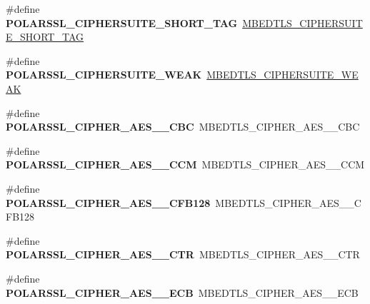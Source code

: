 \begin{DoxyCompactItemize}
\item 
\mbox{\label{compat-1_83_8h_ad6a95e1669ec593781489189077ff727}} 
\#define {\bfseries P\+O\+L\+A\+R\+S\+S\+L\+\_\+\+C\+I\+P\+H\+E\+R\+S\+U\+I\+T\+E\+\_\+\+S\+H\+O\+R\+T\+\_\+\+T\+AG}~\mbox{\hyperlink{ssl__ciphersuites_8h_aa4802f19cdfd24bb9cdbf643460b0355}{M\+B\+E\+D\+T\+L\+S\+\_\+\+C\+I\+P\+H\+E\+R\+S\+U\+I\+T\+E\+\_\+\+S\+H\+O\+R\+T\+\_\+\+T\+AG}}
\item 
\mbox{\label{compat-1_83_8h_a0cfe408058ec3f630c6b8b16c14d14db}} 
\#define {\bfseries P\+O\+L\+A\+R\+S\+S\+L\+\_\+\+C\+I\+P\+H\+E\+R\+S\+U\+I\+T\+E\+\_\+\+W\+E\+AK}~\mbox{\hyperlink{ssl__ciphersuites_8h_a16358b8eb0384954a6932a13fbebb13e}{M\+B\+E\+D\+T\+L\+S\+\_\+\+C\+I\+P\+H\+E\+R\+S\+U\+I\+T\+E\+\_\+\+W\+E\+AK}}
\item 
\mbox{\label{compat-1_83_8h_a5eca891b6c2e88f19ae6e4f674c34039}} 
\#define {\bfseries P\+O\+L\+A\+R\+S\+S\+L\+\_\+\+C\+I\+P\+H\+E\+R\+\_\+\+A\+E\+S\+\_\+\_\+\+C\+BC}~M\+B\+E\+D\+T\+L\+S\+\_\+\+C\+I\+P\+H\+E\+R\+\_\+\+A\+E\+S\+\_\+\_\+\+C\+BC
\item 
\mbox{\label{compat-1_83_8h_aec158b4d302d0542676406ee671c9476}} 
\#define {\bfseries P\+O\+L\+A\+R\+S\+S\+L\+\_\+\+C\+I\+P\+H\+E\+R\+\_\+\+A\+E\+S\+\_\+\_\+\+C\+CM}~M\+B\+E\+D\+T\+L\+S\+\_\+\+C\+I\+P\+H\+E\+R\+\_\+\+A\+E\+S\+\_\+\_\+\+C\+CM
\item 
\mbox{\label{compat-1_83_8h_ac1717311892a945a0103fe705d33b5af}} 
\#define {\bfseries P\+O\+L\+A\+R\+S\+S\+L\+\_\+\+C\+I\+P\+H\+E\+R\+\_\+\+A\+E\+S\+\_\+\_\+\+C\+F\+B128}~M\+B\+E\+D\+T\+L\+S\+\_\+\+C\+I\+P\+H\+E\+R\+\_\+\+A\+E\+S\+\_\+\_\+\+C\+F\+B128
\item 
\mbox{\label{compat-1_83_8h_a02fc8b0fa400bbd5086886d64f4801bc}} 
\#define {\bfseries P\+O\+L\+A\+R\+S\+S\+L\+\_\+\+C\+I\+P\+H\+E\+R\+\_\+\+A\+E\+S\+\_\+\_\+\+C\+TR}~M\+B\+E\+D\+T\+L\+S\+\_\+\+C\+I\+P\+H\+E\+R\+\_\+\+A\+E\+S\+\_\+\_\+\+C\+TR
\item 
\mbox{\label{compat-1_83_8h_a94079188ceb153d0ac54217c110e9c79}} 
\#define {\bfseries P\+O\+L\+A\+R\+S\+S\+L\+\_\+\+C\+I\+P\+H\+E\+R\+\_\+\+A\+E\+S\+\_\+\_\+\+E\+CB}~M\+B\+E\+D\+T\+L\+S\+\_\+\+C\+I\+P\+H\+E\+R\+\_\+\+A\+E\+S\+\_\+\_\+\+E\+CB

\end{DoxyCompactItemize}
